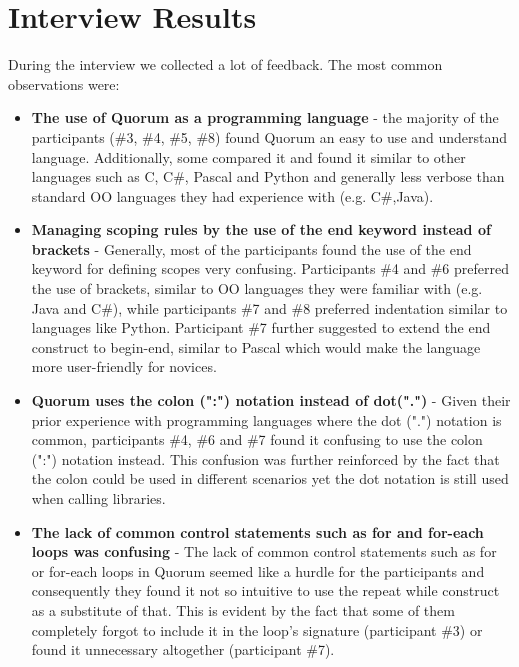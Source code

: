 \section{Interview Results}
During the interview we collected a lot of feedback. The most common observations were:

\begin{itemize}
\item \textbf{The use of Quorum as a programming language} - the majority of the participants (\#3, \#4, \#5, \#8) found Quorum an easy to use and understand language. Additionally, some compared it and found it similar to other languages such as C, C\#, Pascal and Python and generally less verbose than standard OO languages they had experience with (e.g. C\#,Java). 
\item \textbf{Managing scoping rules by the use of the end keyword instead of brackets} - Generally, most of the participants found the use of the end keyword for defining scopes very confusing. Participants \#4 and \#6 preferred the use of brackets, similar to OO languages they were familiar with (e.g. Java and C\#), while participants \#7 and \#8 preferred indentation similar to languages like Python. Participant \#7 further suggested to extend the end construct to begin-end, similar to Pascal which would make the language more user-friendly for novices. 
\item \textbf{Quorum uses the colon (":") notation instead of dot(".")} - Given their prior experience with programming languages where the dot (".") notation is common, participants \#4, \#6 and \#7 found it confusing to use the  colon (":") notation instead. This confusion was further reinforced by the fact that the colon could be used in different scenarios yet the dot notation is still used when calling libraries.
\item \textbf{The lack of common control statements such as for and for-each loops was confusing} - The lack of common control statements such as for or for-each loops in Quorum seemed like a hurdle for the participants and consequently they found it not so intuitive to use the repeat while construct as a substitute of that. This is evident by the fact that some of them completely forgot to include it in the loop's signature (participant \#3) or found it unnecessary altogether (participant \#7).
\end{itemize}